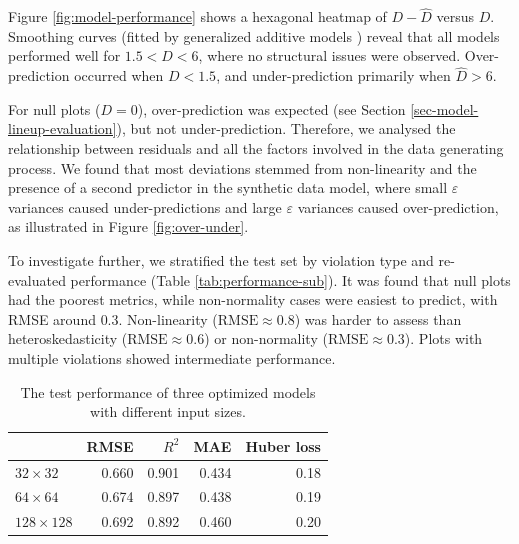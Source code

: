 \documentclass[]{interact}
\theoremstyle{plain}%
\theoremstyle{definition}
\theoremstyle{remark}
\begin{document}
Figure \ref{fig:model-performance} shows a hexagonal heatmap of
\(D - \hat{D}\) versus \(D\). Smoothing curves (fitted by generalized
additive models \citep{hastie2017generalized}) reveal that all models
performed well for \(1.5 < D < 6\), where no structural issues were
observed. Over-prediction occurred when \(D < 1.5\), and
under-prediction primarily when \(\hat{D} > 6\).

For null plots (\(D = 0\)), over-prediction was expected (see Section
\ref{sec-model-lineup-evaluation}), but not under-prediction. Therefore,
we analysed the relationship between residuals and all the factors
involved in the data generating process. We found that most deviations
stemmed from non-linearity and the presence of a second predictor in the
synthetic data model, where small \(\varepsilon\) variances caused
under-predictions and large \(\varepsilon\) variances caused
over-prediction, as illustrated in Figure \ref{fig:over-under}.

To investigate further, we stratified the test set by violation type and
re-evaluated performance (Table \ref{tab:performance-sub}). It was found
that null plots had the poorest metrics, while non-normality cases were
easiest to predict, with RMSE around \(0.3\). Non-linearity
(\(\text{RMSE} \approx  0.8\)) was harder to assess than
heteroskedasticity (\(\text{RMSE} \approx  0.6\)) or non-normality
(\(\text{RMSE} \approx  0.3\)). Plots with multiple violations showed
intermediate performance.

\begin{table}

\caption{\label{tab:performance}The test performance of three optimized models with different input sizes.}
\centering
\begin{tabular}[t]{lrrrr}
\toprule
 & RMSE & $R^2$ & MAE & Huber loss\\
\midrule
$32 \times 32$ & 0.660 & 0.901 & 0.434 & 0.18\\
$64 \times 64$ & 0.674 & 0.897 & 0.438 & 0.19\\
$128 \times 128$ & 0.692 & 0.892 & 0.460 & 0.20\\
\bottomrule
\end{tabular}
\end{table}
\end{document}
